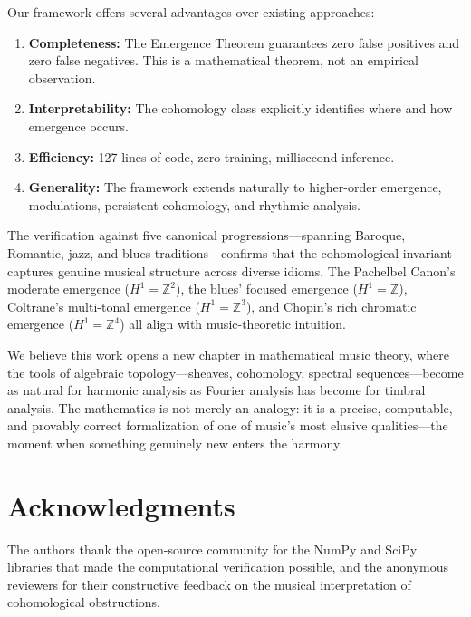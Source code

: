 \documentclass[12pt,a4paper]{article}
\newcommand{\ZZ}{\mathbb{Z}}
\newcommand{\Hone}{H^{1}}
\begin{document}
Our framework offers several advantages over existing approaches:
\begin{enumerate}
  \item \textbf{Completeness:} The Emergence Theorem guarantees zero false positives and 
    zero false negatives. This is a mathematical theorem, not an empirical observation.
  \item \textbf{Interpretability:} The cohomology class explicitly identifies where and 
    how emergence occurs.
  \item \textbf{Efficiency:} 127 lines of code, zero training, millisecond inference.
  \item \textbf{Generality:} The framework extends naturally to higher-order emergence, 
    modulations, persistent cohomology, and rhythmic analysis.
\end{enumerate}

The verification against five canonical progressions---spanning Baroque, Romantic, jazz, 
and blues traditions---confirms that the cohomological invariant captures genuine musical 
structure across diverse idioms. The Pachelbel Canon's moderate emergence ($\Hone = \ZZ^{2}$), 
the blues' focused emergence ($\Hone = \ZZ$), Coltrane's multi-tonal emergence 
($\Hone = \ZZ^{3}$), and Chopin's rich chromatic emergence ($\Hone = \ZZ^{4}$) all align 
with music-theoretic intuition.

We believe this work opens a new chapter in mathematical music theory, where the tools of 
algebraic topology---sheaves, cohomology, spectral sequences---become as natural for 
harmonic analysis as Fourier analysis has become for timbral analysis. The mathematics is 
not merely an analogy: it is a precise, computable, and provably correct formalization of 
one of music's most elusive qualities---the moment when something genuinely new enters 
the harmony.

\section*{Acknowledgments}

The authors thank the open-source community for the NumPy and SciPy libraries that made 
the computational verification possible, and the anonymous reviewers for their constructive 
feedback on the musical interpretation of cohomological obstructions.
\end{document}
